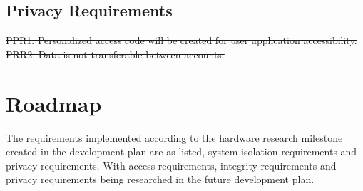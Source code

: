 \documentclass[12pt, titlepage]{article}
\begin{document}
\subsection{Privacy Requirements}
\sout{
PPR1. Personalized access code will be created for user application accessibility. 
\\PRR2. Data is not transferable between accounts.
}

\section{Roadmap}

The requirements implemented according to the hardware research milestone created in the development plan are as listed, system isolation requirements and privacy requirements. With access requirements, integrity requirements and privacy requirements being researched in the future development plan.
\end{document}
